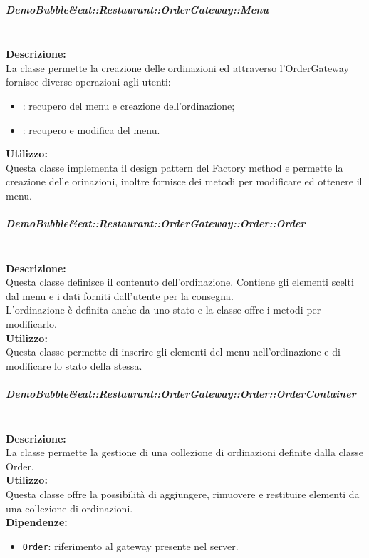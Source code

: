 \subparagraph{Demo\-Bubble\&eat\-::Restaurant\-::Order\-Gateway\-::Menu}\label{eat-menu}\mbox{}\\
\textbf{Descrizione:}\\
La classe permette la creazione delle ordinazioni ed attraverso l'Order\-Gateway fornisce diverse operazioni agli utenti:
\begin{itemize}
	\item \Customer{}: recupero del menu e creazione dell'ordinazione;
	\item \Manager{}: recupero e modifica del menu.
\end{itemize}
\textbf{Utilizzo:}\\
Questa classe implementa il design pattern del Factory method e permette la creazione delle orinazioni, inoltre fornisce dei metodi per modificare ed ottenere il menu.

\subparagraph{Demo\-Bubble\&eat\-::Restaurant\-::Order\-Gateway\-::Order\-::Or\-der}\label{eat-order}\mbox{}\\ 
\textbf{Descrizione:}\\
Questa classe definisce il contenuto dell'ordinazione. Contiene gli elementi scelti dal menu e i dati forniti dall'utente per la consegna.\\
L'ordinazione è definita anche da uno stato e la classe offre i metodi per modificarlo. \\
\textbf{Utilizzo:}\\
Questa classe permette di inserire gli elementi del menu nell'ordinazione e di modificare lo stato della stessa. 

\subparagraph{Demo\-Bubble\&eat\-::Restaurant\-::Order\-Gateway\-::Order\-::Or\-der\-Contai\-ner}\label{eat-container}\mbox{}\\
\textbf{Descrizione:}\\
La classe permette la gestione di una collezione di ordinazioni definite dalla classe Order.\\
\textbf{Utilizzo:}\\
Questa classe offre la possibilità di aggiungere, rimuovere e restituire elementi da una collezione di ordinazioni.\\
\textbf{Dipendenze:}
\begin{itemize}
	\item \texttt{Order}: riferimento al gateway presente nel server.
\end{itemize}